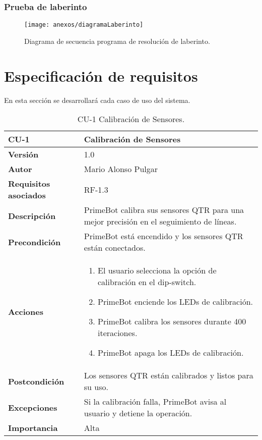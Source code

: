 \subsubsection{Prueba de laberinto}

\begin{figure}[h]
	\centering
	\texttt{[image: anexos/diagramaLaberinto]}
	\caption{Diagrama de secuencia programa de resolución de laberinto.}
	\label{fig:B.2}
\end{figure}


\newpage
\section{Especificación de requisitos}

En esta sección se desarrollará cada caso de uso del sistema.
\begin{table}[p]
	\centering
	\begin{tabularx}{\linewidth}{ p{} p{} }
		\toprule
		\textbf{CU-1}    & \textbf{Calibración de Sensores}\\
		\toprule
		\textbf{Versión}              & 1.0    \\
		\textbf{Autor}                & Mario Alonso Pulgar \\
		\textbf{Requisitos asociados} & RF-1.3 \\
		\textbf{Descripción}          & PrimeBot calibra sus sensores QTR para una mejor precisión en el seguimiento de líneas.\\
		\textbf{Precondición}         & PrimeBot está encendido y los sensores QTR están conectados.\\
		\textbf{Acciones}             &
		\begin{enumerate}
			\def\labelenumi{\arabic{enumi}.}
			\tightlist
			\item El usuario selecciona la opción de calibración en el dip-switch.
			\item PrimeBot enciende los LEDs de calibración.
			\item PrimeBot calibra los sensores durante 400 iteraciones.
			\item PrimeBot apaga los LEDs de calibración.
		\end{enumerate}\\
		\textbf{Postcondición}        & Los sensores QTR están calibrados y listos para su uso.  \\
		\textbf{Excepciones}          & Si la calibración falla, PrimeBot avisa al usuario y detiene la operación.  \\
		\textbf{Importancia}          & Alta \\
		\bottomrule
	\end{tabularx}
	\caption{CU-1 Calibración de Sensores.}
\end{table}

